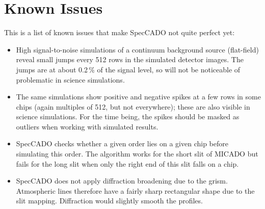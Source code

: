 \documentclass[a4paper,twoside,11pt]{article}
\begin{document}
\section{Known Issues}
\label{sec:issues}

This is a list of known issues that make SpecCADO not quite perfect
yet:
\begin{itemize}
\item High signal-to-noise simulations of a continuum background
  source (flat-field) reveal small jumps every 512 rows in the
  simulated detector images. The jumps are at about 0.2\,\% of the
  signal level, so will not be noticeable of problematic in science
  simulations.
\item The same simulations show positive and negative spikes at a few
  rows in some chips (again multiples of 512, but not everywhere);
  these are also visible in science simulations. For the time being,
  the spikes should be masked as outliers when working with simulated
  results.
\item SpecCADO checks whether a given order lies on a given chip
  before simulating this order. The algorithm works for the short slit
  of MICADO but fails for the long slit when only the right end of
  this slit falls on a chip.
\item SpecCADO does not apply diffraction broadening due to the
  grism. Atmospheric lines therefore have a fairly sharp rectangular
  shape due to the slit mapping. Diffraction would slightly smooth the
  profiles.
\end{itemize}

{}
\label{sec:references}
\end{document}
